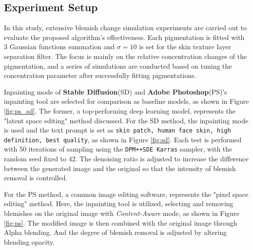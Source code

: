 \begin{spacing}{1.5}
\section{Experiment Setup}
In this study, extensive blemish change simulation experiments are carried out to evaluate the proposed algorithm's effectiveness. Each pigmentation is fitted with 3 Gaussian functions summation and $\sigma=10$ is set for the skin texture layer separation filter. The focus is mainly on the relative concentration changes of the pigmentation, and a series of simulations are conducted based on tuning the concentration parameter after successfully fitting pigmentations.

Inpainting mode of \textbf{Stable Diffusion}(SD)\cite{rombach2021highresolution} and \textbf{Adobe Photoshop}(PS)'s inpainting tool\cite{adobephotoshop} are selected for comparison as baseline models, as shown in Figure \ref{fig:ps_sd}. The former, a top-performing deep learning model, represents the "latent space editing" method discussed. For the SD method, the inpainting mode is used and the text prompt is set as \texttt{skin patch, human face skin, high definition, best quality}, as shown in Figure \ref{fig:sd}. Each test is performed with 50 iterations of sampling using the \texttt{DPM++SDE Karras} sampler, with the random seed fixed to 42. The denoising ratio is adjusted to increase the difference between the generated image and the original so that the intensity of blemish removal is controlled. 

For the PS method, a common image editing software, represents the "pixel space editing" method. Here, the inpainting tool is utilized, selecting and removing blemishes on the original image with \textit{Content-Aware} mode, as shown in Figure \ref{fig:ps}. The modified image is then combined with the original image through Alpha blending. And the degree of blemish removal is adjusted by altering blending opacity.


\end{spacing}
